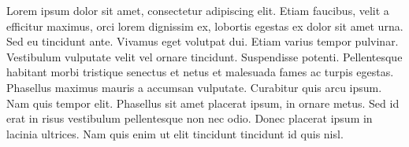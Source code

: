 Lorem ipsum dolor sit amet, consectetur adipiscing elit. Etiam faucibus, velit a efficitur maximus, orci lorem dignissim ex, lobortis egestas ex dolor sit amet urna. Sed eu tincidunt ante. Vivamus eget volutpat dui. Etiam varius tempor pulvinar. Vestibulum vulputate velit vel ornare tincidunt. Suspendisse potenti. Pellentesque habitant morbi tristique senectus et netus et malesuada fames ac turpis egestas. Phasellus maximus mauris a accumsan vulputate. Curabitur quis arcu ipsum. Nam quis tempor elit. Phasellus sit amet placerat ipsum, in ornare metus. Sed id erat in risus vestibulum pellentesque non nec odio. Donec placerat ipsum in lacinia ultrices. Nam quis enim ut elit tincidunt tincidunt id quis nisl. 